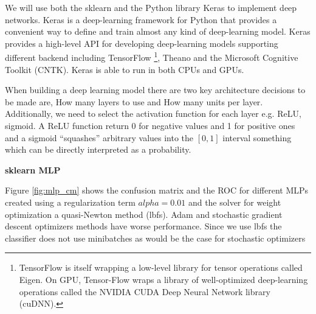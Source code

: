 \documentclass[11pt]{article}
\theoremstyle{definition}
\theoremstyle{remark}
\begin{document}
We will use both the sklearn and the Python library Keras to implement deep networks. Keras is a deep-learning framework for Python that provides a convenient way to define and train almost any kind of deep-learning model. 
Keras provides a high-level API for developing deep-learning models supporting different backend including TensorFlow \footnote{TensorFlow is itself wrapping a low-level library for tensor operations called Eigen. On GPU, Tensor-Flow wraps a library of well-optimized deep-learning operations called the NVIDIA CUDA Deep Neural Network library (cuDNN).}, Theano and the Microsoft Cognitive Toolkit (CNTK). Keras is able to run in both CPUs and GPUs. 

When building a deep learning model there are two key architecture decisions to be made are, How many layers to use and How many units per layer. Additionally, we need to select the activation function for each layer e.g. ReLU, sigmoid. A ReLU function return 0 for negative values and 1 for positive ones and a sigmoid “squashes” arbitrary values into the $[0, 1]$ interval something which can be directly interpreted as a probability.

\textbf{sklearn MLP}

Figure \ref{fig:mlp_cm} shows the confusion matrix and the ROC for different MLPs created using a regularization term $alpha = 0.01$ and the solver for weight optimization a quasi-Newton method (lbfs). Adam and stochastic gradient descent optimizers methods have worse performance. Since we use lbfs the classifier does not use minibatches as would be the case for stochastic optimizers
\end{document}
